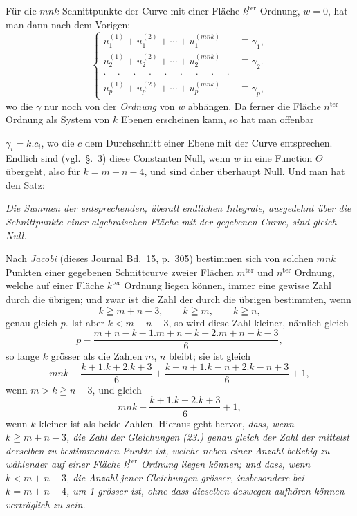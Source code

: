 \documentclass{article}
\begin{document}
Für die $mnk$ Schnittpunkte der Curve mit einer Fläche $k^{\text{ter}}$ Ordnung, $w=0$, hat man dann nach dem Vorigen:
\[
\left\{
\begin{aligned}
u_{1}^{(1)}+u_{1}^{(2)}+\cdots+u_{1}^{(mnk)} &\equiv \gamma_{1},\\
u_{2}^{(1)}+u_{2}^{(2)}+\cdots+u_{2}^{(mnk)} &\equiv \gamma_{2}.\\
\cdot\quad\cdot\quad\cdot\quad\cdot\quad\cdot\quad\cdot\quad\cdot\quad\cdot\quad\cdot &\\
u_{p}^{(1)}+u_{p}^{(2)}+\cdots+u_{p}^{(mnk)} &\equiv \gamma_{p},
\end{aligned}
\right.\tag{23.}
\]
wo die $\gamma$ nur noch von der \emph{Ordnung} von $w$ abhängen. Da ferner die Fläche $n^{\text{ter}}$ Ordnung als System von $k$ Ebenen erscheinen kann, so hat man offenbar

$\gamma_{i}=k.c_{i}$, wo die $c$ dem Durchschnitt einer Ebene mit der Curve entsprechen. Endlich sind (vgl.\ §.~3) diese Constanten Null, wenn $w$ in eine Function $\Theta$ übergeht, also für $k=m+n-4$, und sind daher überhaupt Null. Und man hat den Satz:

\emph{Die Summen der entsprechenden, überall endlichen Integrale, ausgedehnt über die Schnittpunkte einer algebraischen Fläche mit der gegebenen Curve, sind gleich Null.}

Nach \emph{Jacobi} (dieses Journal Bd.\ 15, p.\ 305) bestimmen sich von solchen $mnk$ Punkten einer gegebenen Schnittcurve zweier Flächen $m^{\text{ter}}$ und $n^{\text{ter}}$ Ordnung, welche auf einer Fläche $k^{\text{ter}}$ Ordnung liegen können, immer eine gewisse Zahl durch die übrigen; und zwar ist die Zahl der durch die übrigen bestimmten, wenn
\[
k\geqq m+n-3,\qquad k\geqq m,\qquad k\geqq n,
\]
genau gleich $p$. Ist aber $k<m+n-3$, so wird diese Zahl kleiner, nämlich gleich
\[
p-\frac{m+n-k-1.m+n-k-2.m+n-k-3}{6},
\]
so lange $k$ grösser als die Zahlen $m$, $n$ bleibt; sie ist gleich
\[
mnk-\frac{k+1.k+2.k+3}{6}+\frac{k-n+1.k-n+2.k-n+3}{6}+1,
\]
wenn $m>k\geqq n-3$, und gleich
\[
mnk-\frac{k+1.k+2.k+3}{6}+1,
\]
wenn $k$ kleiner ist als beide Zahlen. Hieraus geht hervor, \emph{dass, wenn $k\geqq m+n-3$, die Zahl der Gleichungen (23.) genau gleich der Zahl der mittelst derselben zu bestimmenden Punkte ist, welche neben einer Anzahl beliebig zu wählender auf einer Fläche $k^{\text{ter}}$ Ordnung liegen können; und dass, wenn $k<m+n-3$, die Anzahl jener Gleichungen grösser, insbesondere bei $k=m+n-4$, um 1 grösser ist, ohne dass dieselben deswegen aufhören können verträglich zu sein.}
\end{document}
